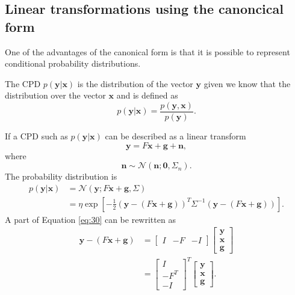 \documentclass[12pt,oneside,openany,a4paper, %
afrikaans,english,
]{memoir}
\numberwithin{equation}{chapter}
\begin{document}
\subsection{Linear transformations using the canoncical form}
One of the advantages of the canonical form is that it is possible to represent conditional probability distributions.

The CPD $p(\bm{y}|\bm{x})$ is the distribution of the vector $\bm{y}$ given we know that the distribution over the vector $\bm{x}$ and is defined as
\begin{equation}
p(\bm{y}|\bm{x}) = \frac{p(\bm{y},\bm{x})}{p(\bm{y})}.
\end{equation}

If a CPD such as $p(\bm{y}|\bm{x})$ can be described as a linear transform
\begin{equation}
\bm{y} = F\bm{x} + \bm{g} + \bm{n},
\end{equation}
where
\begin{equation}
\bm{n} \sim \mathcal{N}(\bm{n}; \bm{0}, \Sigma_n).
\end{equation}
The probability distribution is
\begin{equation}
\label{eq:30}
\begin{split}
p(\bm{y}|\bm{x}) & = \mathcal{N}(\bm{y}; F\bm{x} + \bm{g}, \Sigma) \\
& = \eta\exp\left[-\frac{1}{2}(\bm{y} - (F\bm{x} + \bm{g}))^T\Sigma^{-1}(\bm{y}-(F\bm{x} + \bm{g}))\right].
\end{split}
\end{equation}
A part of Equation \ref{eq:30} can be rewritten as 
\begin{equation}\label{eq: rewrite}
\begin{split}
\bm{y} - (F\bm{x} + \bm{g}) & =
\begin{bmatrix}
I&-F&-I
\end{bmatrix}
\begin{bmatrix}
\bm{y}\\
\bm{x}\\
\bm{g}
\end{bmatrix}\\
& =
\begin{bmatrix}
I\\-F^T\\-I
\end{bmatrix}^T
\begin{bmatrix}
\bm{y}\\
\bm{x}\\
\bm{g}
\end{bmatrix}.
\end{split}
\end{equation}
\end{document}
